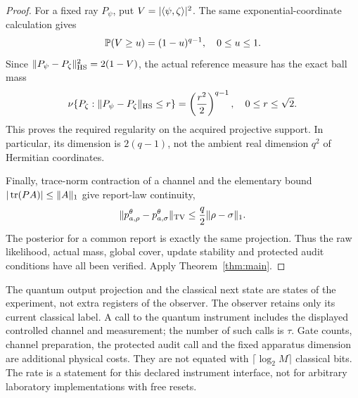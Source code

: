 \begin{proof}
For a fixed ray $P_\psi$, put $V=|\langle \psi,\zeta\rangle|^2$. The same exponential-coordinate calculation gives
\[
 \mathbb P(V\ge u)=(1-u)^{q-1},\quad 0\le u\le1.
\]
Since $\lVert P_\psi-P_\zeta\rVert_{\mathrm{HS}}^2=2(1-V)$, the actual reference measure has the exact ball mass
\begin{equation}\label{eq:projective-mass}
 \nu\{P_\zeta:\lVert P_\psi-P_\zeta\rVert_{\mathrm{HS}}\le r\}
       =\left(\frac{r^2}{2}\right)^{q-1},\quad 0\le r\le\sqrt2.
\end{equation}
This proves the required regularity on the acquired projective support. In particular, its dimension is $2(q-1)$, not the ambient real dimension $q^2$ of Hermitian coordinates.

Finally, trace-norm contraction of a channel and the elementary bound $|\operatorname{tr}(PA)|\le\lVert A\rVert_1$ give report-law continuity,
\[
 \lVert p_{a,\rho}^\theta-p_{a,\sigma}^\theta\rVert_{\mathrm{TV}}
 \le\frac q2\lVert \rho-\sigma\rVert_1.
\]
The posterior for a common report is exactly the same projection. Thus the raw likelihood, actual mass, global cover, update stability and protected audit conditions have all been verified. Apply Theorem~\ref{thm:main}.
\end{proof}

\begin{remark}
The quantum output projection and the classical next state are states of the experiment, not extra registers of the observer. The observer retains only its current classical label. A call to the quantum instrument includes the displayed controlled channel and measurement; the number of such calls is $\tau$. Gate counts, channel preparation, the protected audit call and the fixed apparatus dimension are additional physical costs. They are not equated with $\lceil\log_2M\rceil$ classical bits. The rate is a statement for this declared instrument interface, not for arbitrary laboratory implementations with free resets.
\end{remark}

